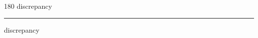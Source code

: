 
\begin{frame}
\begin{center}
\begin{turn}{180}
{\fontsize{2.5cm}{1em}\selectfont discrepancy}
\end{turn}
\vspace{1em}\par  
\hrule
\vspace{1em}\par  
{\fontsize{2.5cm}{1em}\selectfont discrepancy}
\end{center}
\end{frame}
